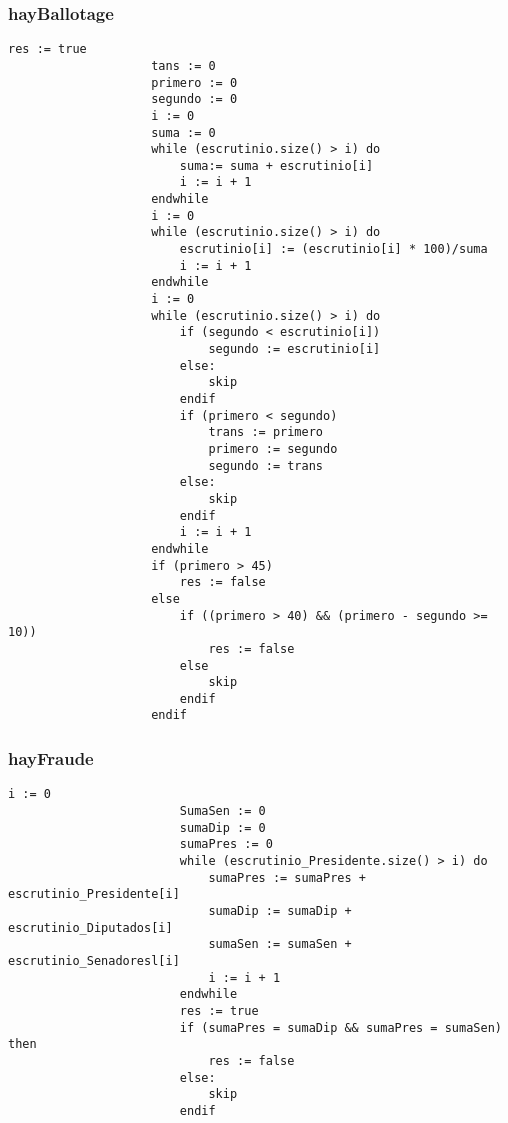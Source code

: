 \documentclass[10pt,a4paper]{article}
\begin{document}
		\subsubsection{hayBallotage}
			\begin{minipage}[t]{\textwidth}
				\begin{lstlisting}[caption={()},label=code:for]
					res := true
					tans := 0
					primero := 0
					segundo := 0
					i := 0
					suma := 0
					while (escrutinio.size() > i) do
						suma:= suma + escrutinio[i]
						i := i + 1
					endwhile
					i := 0
					while (escrutinio.size() > i) do
						escrutinio[i] := (escrutinio[i] * 100)/suma
						i := i + 1
					endwhile
					i := 0
					while (escrutinio.size() > i) do 
						if (segundo < escrutinio[i])
							segundo := escrutinio[i]
						else:
							skip
						endif
						if (primero < segundo)
							trans := primero
							primero := segundo
							segundo := trans
						else:
							skip
						endif
						i := i + 1
					endwhile
					if (primero > 45)
						res := false
					else
						if ((primero > 40) && (primero - segundo >= 10))
							res := false
						else
							skip
						endif
					endif

				\end{lstlisting}
			\end{minipage}

		\subsubsection{hayFraude}
			\begin{minipage}[t]{\textwidth}
				\begin{lstlisting}[caption={()},label=code:for]
						i := 0
						SumaSen := 0
						sumaDip := 0
						sumaPres := 0
						while (escrutinio_Presidente.size() > i) do
							sumaPres := sumaPres + escrutinio_Presidente[i]
							sumaDip := sumaDip + escrutinio_Diputados[i]
							sumaSen := sumaSen + escrutinio_Senadoresl[i]
							i := i + 1
						endwhile
						res := true
						if (sumaPres = sumaDip && sumaPres = sumaSen) then 
							res := false
						else:
							skip
						endif
				\end{lstlisting}
			\end{minipage}
\end{document}
